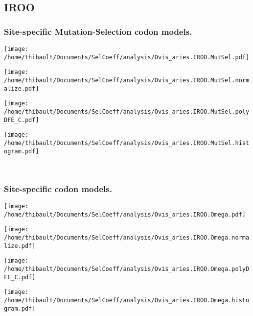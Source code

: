 \subsection{IROO} 
 
\subsubsection*{Site-specific Mutation-Selection codon models.} 
\begin{minipage}{0.49\linewidth} 
\texttt{[image: /home/thibault/Documents/SelCoeff/analysis/Ovis\_aries.IROO.MutSel.pdf]} 
\end{minipage}
\begin{minipage}{0.49\linewidth} 
\texttt{[image: /home/thibault/Documents/SelCoeff/analysis/Ovis\_aries.IROO.MutSel.normalize.pdf]} 
\end{minipage}
\begin{minipage}{0.49\linewidth} 
\texttt{[image: /home/thibault/Documents/SelCoeff/analysis/Ovis\_aries.IROO.MutSel.polyDFE\_C.pdf]} 
\end{minipage}
\begin{minipage}{0.49\linewidth} 
\texttt{[image: /home/thibault/Documents/SelCoeff/analysis/Ovis\_aries.IROO.MutSel.histogram.pdf]} 
\end{minipage}
\\ 
\subsubsection*{Site-specific codon models.} 
\begin{minipage}{0.49\linewidth} 
\texttt{[image: /home/thibault/Documents/SelCoeff/analysis/Ovis\_aries.IROO.Omega.pdf]} 
\end{minipage}
\begin{minipage}{0.49\linewidth} 
\texttt{[image: /home/thibault/Documents/SelCoeff/analysis/Ovis\_aries.IROO.Omega.normalize.pdf]} 
\end{minipage}
\begin{minipage}{0.49\linewidth} 
\texttt{[image: /home/thibault/Documents/SelCoeff/analysis/Ovis\_aries.IROO.Omega.polyDFE\_C.pdf]} 
\end{minipage}
\begin{minipage}{0.49\linewidth} 
\texttt{[image: /home/thibault/Documents/SelCoeff/analysis/Ovis\_aries.IROO.Omega.histogram.pdf]} 
\end{minipage}
\\ 
